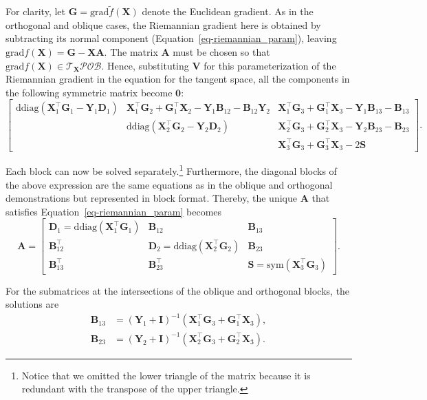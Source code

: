 \documentclass[
  12pt,
  letterpaper,
  article]{scrartcl}
\begin{document}
For clarity, let \(\mathbf{G} = \mathrm{grad}\tilde{f}(\mathbf{X})\)
denote the Euclidean gradient. As in the orthogonal and oblique cases,
the Riemannian gradient here is obtained by subtracting its normal
component (Equation~\ref{eq-riemannian_param}), leaving
\(\mathrm{grad}f(\mathbf{X})=\mathbf{G}-\mathbf{X}\mathbf{A}\). The
matrix \(\mathbf{A}\) must be chosen so that
\(\mathrm{grad}f(\mathbf{X}) \in \mathcal{T}_{\mathbf{X}} \mathcal{POB}\).
Hence, substituting \(\mathbf{V}\) for this parameterization of the
Riemannian gradient in the equation for the tangent space, all the
components in the following symmetric matrix become \(\mathbf{0}\): \[
\begin{bmatrix}
\mathrm{ddiag}\!\left(
\mathbf{X}_1^\top \mathbf{G}_1-\mathbf{Y}_1\mathbf{D}_1
\right)
&
\mathbf{X}_1^\top\mathbf{G}_2
+\mathbf{G}_1^\top\mathbf{X}_2
-\mathbf{Y}_1\mathbf{B}_{12}
-\mathbf{B}_{12}\mathbf{Y}_2
&
\mathbf{X}_1^\top\mathbf{G}_3
+\mathbf{G}_1^\top\mathbf{X}_3
-\mathbf{Y}_1\mathbf{B}_{13}
-\mathbf{B}_{13}
\\
&
\mathrm{ddiag}\!\left(
\mathbf{X}_2^\top \mathbf{G}_2-\mathbf{Y}_2\mathbf{D}_2
\right)
&
\mathbf{X}_2^\top\mathbf{G}_3
+\mathbf{G}_2^\top\mathbf{X}_3
-\mathbf{Y}_2\mathbf{B}_{23}
-\mathbf{B}_{23}
\\
&
&
\mathbf{X}_3^\top \mathbf{G}_3+ \mathbf{G}_3^\top \mathbf{X}_3 - 2\mathbf S
\end{bmatrix}.
\]

Each block can now be solved separately.\footnote{Notice that we omitted
  the lower triangle of the matrix because it is redundant with the
  transpose of the upper triangle.} Furthermore, the diagonal blocks of
the above expression are the same equations as in the oblique and
orthogonal demonstrations but represented in block format. Thereby, the
unique \(\mathbf{A}\) that satisfies Equation~\ref{eq-riemannian_param}
becomes \[
\mathbf{A} = 
\begin{bmatrix}
\mathbf{D}_1 = \mathrm{ddiag}\!\left( \mathbf{X}_1^\top \mathbf{G}_1 \right)
&
\mathbf{B}_{12}
&
\mathbf{B}_{13}
\\
\mathbf{B}_{12}^\top
&
\mathbf{D}_2 = \mathrm{ddiag}\!\left( \mathbf{X}_2^\top \mathbf{G}_2 \right)
&
\mathbf{B}_{23}
\\
\mathbf{B}_{13}^\top
&
\mathbf{B}_{23}^\top
&
\mathbf{S} = \text{sym}(\mathbf{X}_3^\top \mathbf{G}_3)
\end{bmatrix}.
\]

For the submatrices at the intersections of the oblique and orthogonal
blocks, the solutions are \[
\begin{aligned}
\mathbf{B}_{13} &= (\mathbf{Y}_1 + \mathbf{I})^{-1}(\mathbf{X}_1^\top\mathbf{G}_3 +\mathbf{G}_1^\top\mathbf{X}_3), \\
\mathbf{B}_{23} &= (\mathbf{Y}_2 + \mathbf{I})^{-1}(\mathbf{X}_2^\top\mathbf{G}_3 +\mathbf{G}_2^\top\mathbf{X}_3).
\end{aligned}
\]
\end{document}
